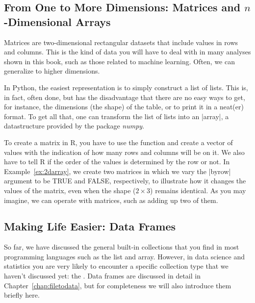 \subsection{From One to More Dimensions: Matrices and $n$-Dimensional Arrays}

 Matrices are two-dimensional rectangular datasets that include values
in rows and columns. This is the kind of data you will have to deal
with in many analyses shown in this book, such as those related to
machine learning. Often, we can generalize to higher dimensions.


In Python, the easiest representation is to simply construct a list of
lists. This is, in fact, often done, but has the disadvantage that
there are no easy ways to get, for instance, the dimensions (the
shape) of the table, or to print it in a neat(er) format. To get all
that, one can transform the list of lists into an |array|, a
datastructure provided by the package \emph{numpy}.

To create a matrix in R, you have to use the function  and
create a vector of values with the indication of how many rows and
columns will be on it. We also have to tell R if the order of the
values is determined by the row or not. In Example~\ref{ex:2darray}, we create
two matrices in which we vary the |byrow| argument to be TRUE and
FALSE, respectively, to illustrate how it changes the values of the
matrix, even when the shape ($2 \times3$) remains identical. As you may
imagine, we can operate with matrices, such as adding up two of them.



\subsection{Making Life Easier: Data Frames}

So far, we have discussed the general built-in collections that you find in most programming languages
such as the list and array.
However, in data science and statistics you are very likely to encounter a specific collection type that we haven't discussed yet: the .
Data frames are discussed in detail in Chapter~\ref{chap:filetodata},
but for completeness we will also introduce them briefly here. 

